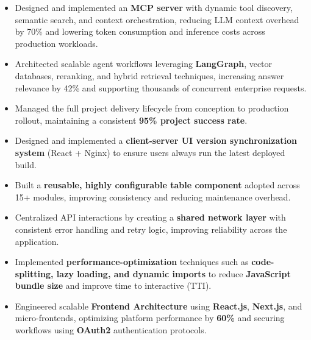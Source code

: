 \documentclass[100pt,a4paper]{article}
\begin{document}
\begin{itemize}
\item {Designed and implemented an \textbf{MCP server} with dynamic tool discovery, semantic search, and context orchestration, reducing LLM context overhead by 70\% and lowering token consumption and inference costs across production workloads.}
\item {Architected scalable agent workflows leveraging \textbf{LangGraph}, vector databases, reranking, and hybrid retrieval techniques, increasing answer relevance by 42\% and supporting thousands of concurrent enterprise requests.}
\item {Managed the full project delivery lifecycle from conception to production rollout, maintaining a consistent \textbf{95\% project success rate}.}
\item {Designed and implemented a \textbf{client-server UI version synchronization system} (React + Nginx) to ensure users always run the latest deployed build.}
\item {Built a \textbf{reusable, highly configurable table component} adopted across 15+ modules, improving consistency and reducing maintenance overhead.}
\item {Centralized API interactions by creating a \textbf{shared network layer} with consistent error handling and retry logic, improving reliability across the application.}
\item {Implemented \textbf{performance-optimization} techniques such as \textbf{code-splitting, lazy loading, and dynamic imports} to reduce \textbf{JavaScript bundle size} and improve time to interactive (TTI).}
\item {Engineered scalable \textbf{Frontend Architecture} using \textbf{React.js}, \textbf{Next.js}, and micro-frontends, optimizing platform performance by \textbf{60\%} and securing workflows using \textbf{OAuth2} authentication protocols.}
\end{itemize}
\end{document}
